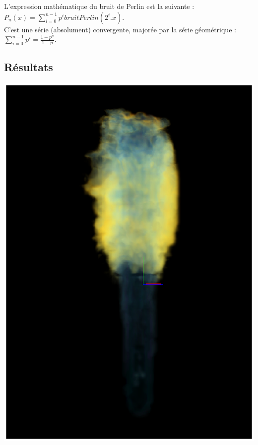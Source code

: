 \documentclass[a4paper,10pt]{article}
\begin{document}
L'expression mathématique du bruit de Perlin est la suivante :\\
$P_n(x) = \sum_{i=0}^{n-1} p^i bruitPerlin(2^i.x)$.\\
C'est une série (absolument) convergente, majorée par la série géométrique :\\
$\sum_{i=0}^{n-1} p^i = \frac{1 - p^n}{1 - p}$.\\

\newpage
\subsection{Résultats}


    \begin{center}
	\includegraphics[scale=0.6]{FlammeBleue.ps}\\

\end{center}
\end{document}
